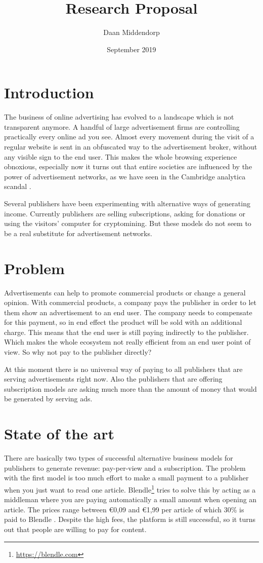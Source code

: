 \documentclass[a4paper]{article}
\title{Research Proposal}
\author{Daan Middendorp}
\date{September 2019}
\begin{document}
\maketitle

\section{Introduction}
The business of online advertising has evolved to a landscape which is not transparent anymore. A handful of large advertisement firms are controlling practically every online ad you see. Almost every movement during the visit of a regular website is sent in an obfuscated way to the advertisement broker, without any visible sign to the end user. This makes the whole browsing experience obnoxious, especially now it turns out that entire societies are influenced by the power of advertisement networks, as we have seen in the Cambridge analytica scandal .

Several publishers have been experimenting with alternative ways of generating income. Currently publishers are selling subscriptions, asking for donations or using the visitors' computer for cryptomining. But these models do not seem to be a real substitute for advertisement networks.

\section{Problem}
Advertisements can help to promote commercial products or change a general opinion. With commercial products, a company pays the publisher in order to let them show an advertisement to an end user. The company needs to compensate for this payment, so in end effect the product will be sold with an additional charge. This means that the end user is still paying indirectly to the publisher. Which makes the whole ecosystem not really efficient from an end user point of view. So why not pay to the publisher directly?

At this moment there is no universal way of paying to all publishers that are serving advertisements right now. Also the publishers that are offering subscription models are asking much more than the amount of money that would be generated by serving ads.

\section{State of the art}
\label{stateoftheart}
There are basically two types of successful alternative business models for publishers to generate revenue: pay-per-view and a subscription. The problem with the first model is too much effort to make a small payment to a publisher when you just want to read one article. Blendle\footnote{\url{https://blendle.com}} tries to solve this by acting as a middleman where you are paying automatically a small amount when opening an article. The prices range between €0,09 and €1,99 per article of which 30\% is paid to Blendle . Despite the high fees, the platform is still successful, so it turns out that people are willing to pay for content.
\end{document}
